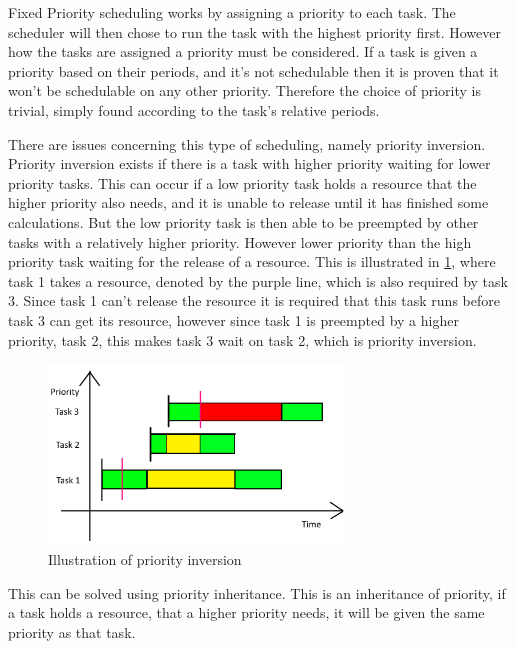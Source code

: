 Fixed Priority scheduling works by assigning a priority to each task. The scheduler will then chose to run the task with the highest priority first. However how the tasks are assigned a priority must be considered. If a task is given a priority based on their periods, and it's not schedulable then it is proven that it won't be schedulable on any other priority. Therefore the choice of priority is trivial, simply found according to the task's relative periods.

There are issues concerning this type of scheduling, namely priority inversion. Priority inversion exists if there is a task with higher priority waiting for lower priority tasks. This can occur if a low priority task holds a resource that the higher priority also needs, and it is unable to release until it has finished some calculations. But the low priority task is then able to be preempted by other tasks with a relatively higher priority. However lower priority than the high priority task waiting for the release of a resource. This is illustrated in \ref{priorityInvertion}, where task 1 takes a resource, denoted by the purple line, which is also required by task 3. Since task 1 can't release the resource it is required that this task runs before task 3 can get its resource, however since task 1 is preempted by a higher priority, task 2, this makes task 3 wait on task 2, which is priority inversion.
\begin{figure}[H]
    \centering
    \includegraphics[width=0.7\textwidth]{Images/Analysis/priorityInvertion.png}
    \caption{Illustration of priority inversion}
    \label{priorityInvertion}
\end{figure}

This can be solved using priority inheritance. This is an inheritance of priority, if a task holds a resource, that a higher priority needs, it will be given the same priority as that task. 

